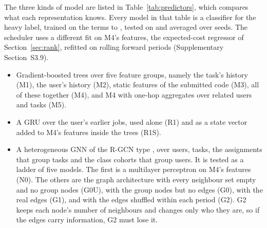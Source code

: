 The three kinds of model are listed in Table~\ref{tab:predictors}, which compares what each
representation knows. Every model in that table is a classifier for the heavy label,
trained on the terms  to , tested on  and
averaged over  seeds. The scheduler uses a different fit on M4's features, the
expected-cost regressor of Section~\ref{sec:rank}, refitted on rolling forward periods
(Supplementary Section~S3.9).
\begin{itemize}
  \item Gradient-boosted trees \cite{ke2017lightgbm} over five feature groups, namely the
  task's history (M1), the user's history (M2), static features of the submitted code (M3), all
  of these together (M4), and M4 with one-hop aggregates over related users and tasks
  (M5).
  \item A GRU over the user's earlier jobs, used alone (R1) and as a
  state vector added to M4's features inside the trees (R1S).
  \item A heterogeneous GNN of the R-GCN type \cite{schlichtkrull2018rgcn}, over users, tasks, the assignments
  that group tasks and the class cohorts that group users. It is tested as a ladder of
  five models. The first is a multilayer perceptron on M4's features (N0). The others are
  the graph architecture with every neighbour set empty and no group nodes (G0U), with the
  group nodes but no edges (G0), with the real edges (G1), and with the edges shuffled
  within each period (G2). G2 keeps each node's
  number of neighbours and changes only who they are, so if the edges carry information,
  G2 must lose it.
\end{itemize}

